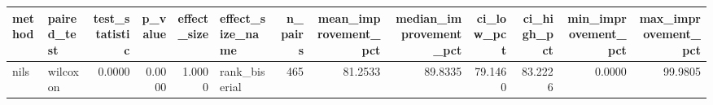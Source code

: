 \begin{tabular}{llrrrlrrrrrrr}
\toprule
method & paired_test & test_statistic & p_value & effect_size & effect_size_name & n_pairs & mean_improvement_pct & median_improvement_pct & ci_low_pct & ci_high_pct & min_improvement_pct & max_improvement_pct \\
\midrule
nils & wilcoxon & 0.0000 & 0.0000 & 1.0000 & rank_biserial & 465 & 81.2533 & 89.8335 & 79.1460 & 83.2226 & 0.0000 & 99.9805 \\
\bottomrule
\end{tabular}
